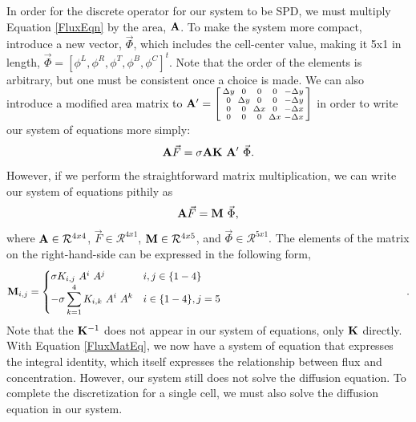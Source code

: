 \documentclass[11pt,letterpaper,oneside,notitlepage]{article}	%
\newcommand{\eq}[1]{Equation \eqref{#1}}		%
\numberwithin{equation}{section}				%
\begin{document}
In order for the discrete operator for our system to be SPD, we must multiply \eq{FluxEqn} by the area, $\bf A$\cite{Runnels2006, Morel1998}. To make the system more compact, introduce a new vector, $\vec \Phi$, which includes the cell-center value, making it 5x1 in length, $\vec\Phi=[\phi^L,\phi^R,\phi^T,\phi^B,\phi^C]^t$. Note that the order of the elements is arbitrary, but one must be consistent once a choice is made.  We can also introduce a modified area matrix to ${\bf A'}=\left[\begin{smallmatrix} \Delta y&0&0&0&-\Delta y\\0&\Delta y&0&0&-\Delta y\\0&0&\Delta x&0&-\Delta x\\0&0&0&\Delta x&-\Delta x\end{smallmatrix}\right]$ in order to write our system of equations more simply:
\begin{equation}
{\bf A}\vec F =\sigma{\bf A}{\bf K}\ {\bf A'}\ \vec\Phi.
\end{equation}
However, if we perform the straightforward matrix multiplication, we can write our system of equations pithily as
\begin{equation}
{\bf A}\vec F={\bf M}\ \vec\Phi\label{FluxMatEq},
\end{equation}
where ${\bf A}\in\mathcal R^{4x4}$, $\vec F\in\mathcal R^{4x1}$, ${\bf M}\in\mathcal R^{4x5}$, and $\vec\Phi\in\mathcal R^{5x1}$.  The elements of the matrix on the right-hand-side can be expressed in the following form,
\begin{equation}  
{\bf M}_{i,j}=\begin{cases}
\sigma K_{i,j}\ A^i\ A^j & i,j\in\{1-4\} \\\noalign{\:}
-\sigma\displaystyle\sum_{k=1}^4 K_{i,k}\ A^i\ A^k & i\in\{1-4\}, j=5
\end{cases}\label{Mformula}.\end{equation}
Note that the ${\bf K}^{-1}$ does not appear in our system of equations, only $\bf K$ directly. With \eq{FluxMatEq}, we now have a system of equation that expresses the integral identity, which itself expresses the relationship between flux and concentration. However, our system still does not solve the diffusion equation. To complete the discretization for a single cell, we must also solve the diffusion equation in our system.

\end{document}
